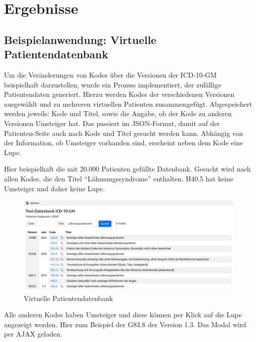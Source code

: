 \section{Ergebnisse}

\subsection{Beispielanwendung: Virtuelle Patientendatenbank}
\label{virtpat}

Um die Veränderungen von Kodes über die Versionen der ICD-10-GM beispielhaft darzustellen, wurde ein Prozess implementiert, der zufällige Patientendaten generiert. Hierzu werden Kodes der verschiedenen Versionen ausgewählt und zu mehreren virtuellen Patienten zusammengefügt. Abgespeichert werden jeweils: Kode und Titel, sowie die Angabe, ob der Kode zu anderen Versionen Umsteiger hat. Das passiert im JSON-Format, damit auf der Patienten-Seite auch nach Kode und Titel gesucht werden kann. Abhängig von der Information, ob Umsteiger vorhanden sind, erscheint neben dem Kode eine Lupe. 

Hier beispielhaft die mit 20.000 Patienten gefüllte Datenbank. Gesucht wird nach allen Kodes, die den Titel "`Lähmungssyndrome"' enthalten. H40.5 hat keine Umsteiger und daher keine Lupe.

\begin{figure}[H]
    \centering
    \includegraphics[width=\linewidth]{../img/patients_screenshot.png}
    \vspace{-1em}\caption{Virtuelle Patientendatenbank}
\end{figure}

Alle anderen Kodes haben Umsteiger und diese können per Klick auf die Lupe angezeigt werden. Hier zum Beispiel der G83.8 der Version 1.3. Das Modal wird per AJAX geladen. 

